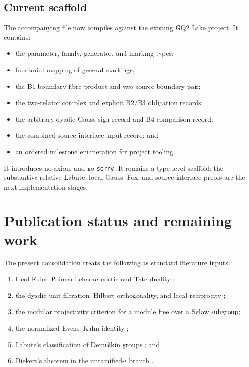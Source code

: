 \documentclass[11pt,reqno]{amsart}
\theoremstyle{definition}
\theoremstyle{remark}
\numberwithin{equation}{section}
\begin{document}
\subsection{Current scaffold}

The accompanying file
 now compiles against
the existing GQ2 Lake project.  It contains:
\begin{itemize}
\item the parameter, family, generator, and marking types;
\item functorial mapping of general markings;
\item the B1 boundary fibre product and two-source boundary pair;
\item the two-relator complex and explicit B2/B3 obligation records;
\item the arbitrary-dyadic Gauss-sign record and B4 comparison record;
\item the combined source-interface input record; and
\item an ordered milestone enumeration for project tooling.
\end{itemize}
It introduces no axiom and no \texttt{sorry}.  It remains a type-level
scaffold: the substantive relative Labute, local Gauss, Fox, and
source-interface proofs are the next implementation stages.

\section{Publication status and remaining work}\label{sec:status}

The present consolidation treats the following as standard literature
inputs:
\begin{enumerate}
\item local Euler--Poincar\'e characteristic and Tate duality
\cite[Chapter VII]{NSW};
\item the dyadic unit filtration, Hilbert orthogonality, and local
reciprocity \cite{SerreLocal};
\item the modular projectivity criterion for a module free over a Sylow
subgroup;
\item the normalized Evens--Kahn identity
\cite{Evens1963,Kahn1984,Kozlowski1984};
\item Labute's classification of Demu\v{s}kin groups
\cite{Labute1967}; and
\item Diekert's theorem in the unramified-\(i\) branch
\cite{Diekert1984}.
\end{enumerate}
\end{document}
